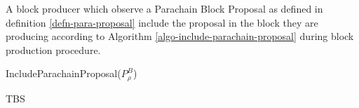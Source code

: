 A block producer which observe a Parachain Block Proposal as defined in definition \ref{defn-para-proposal}  include the proposal in the block they are producing according to Algorithm \ref{algo-include-parachain-proposal} during block production procedure.

\begin{algorithm}[H]
  \caption[]{\sc IncludeParachainProposal($P^B_{\rho}$)}
  \label{algo-include-parachain-proposal}
  \begin{algorithmic}[1]
    \Require{}

    \State TBS
  \end{algorithmic}
\end{algorithm}